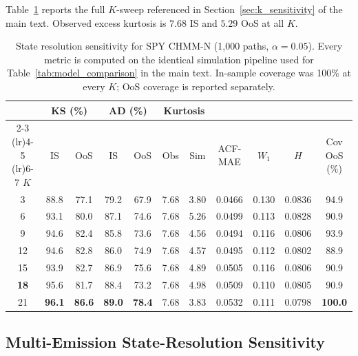 Table~\ref{tab:sensitivity} reports the full $K$-sweep referenced in Section~\ref{sec:k_sensitivity} of the main text.
Observed excess kurtosis is $7.68$ IS and $5.29$ OoS at all $K$.

\begin{table}[H]
\centering
\caption{State resolution sensitivity for SPY CHMM-N (1{,}000 paths, $\alpha = 0.05$). Every metric is computed on the identical simulation pipeline used for Table~\ref{tab:model_comparison} in the main text. In-sample coverage was 100\% at every $K$; OoS coverage is reported separately.}
\label{tab:sensitivity}
\small
\begin{tabular}{c cc cc cc c c c c}
\toprule
& \multicolumn{2}{c}{KS (\%)} & \multicolumn{2}{c}{AD (\%)} & \multicolumn{2}{c}{Kurtosis} & & & & \\
\cmidrule(lr){2-3} \cmidrule(lr){4-5} \cmidrule(lr){6-7}
$K$ & IS & OoS & IS & OoS & Obs & Sim & ACF-MAE & $W_1$ & $H$ & Cov OoS (\%) \\
\midrule
3  & 88.8 & 77.1 & 79.2 & 67.9 & 7.68 & 3.80 & 0.0466 & 0.130 & 0.0836 & 94.9 \\
6  & 93.1 & 80.0 & 87.1 & 74.6 & 7.68 & 5.26 & 0.0499 & 0.113 & 0.0828 & 90.9 \\
9  & 94.6 & 82.4 & 85.8 & 73.6 & 7.68 & 4.56 & 0.0494 & 0.116 & 0.0806 & 93.9 \\
12 & 94.6 & 82.8 & 86.0 & 74.9 & 7.68 & 4.57 & 0.0495 & 0.112 & 0.0802 & 88.9 \\
15 & 93.9 & 82.7 & 86.9 & 75.6 & 7.68 & 4.89 & 0.0505 & 0.116 & 0.0806 & 90.9 \\
\textbf{18} & 95.6 & 81.7 & 88.4 & 73.2 & 7.68 & 4.98 & 0.0509 & 0.110 & 0.0805 & 90.9 \\
21 & \textbf{96.1} & \textbf{86.6} & \textbf{89.0} & \textbf{78.4} & 7.68 & 3.83 & 0.0532 & 0.111 & 0.0798 & \textbf{100.0} \\
\bottomrule
\end{tabular}
\end{table}

\subsection{Multi-Emission State-Resolution Sensitivity}
\label{sec:multi_emission_sensitivity}

